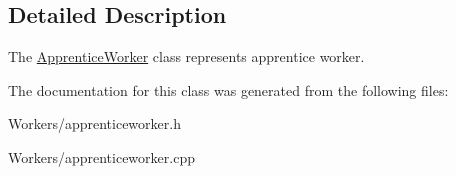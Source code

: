 \subsection{Detailed Description}
The \hyperlink{class_game_1_1_apprentice_worker}{Apprentice\-Worker} class represents apprentice worker. 

The documentation for this class was generated from the following files\-:\begin{DoxyCompactItemize}
\item 
Workers/apprenticeworker.\-h\item 
Workers/apprenticeworker.\-cpp\end{DoxyCompactItemize}
